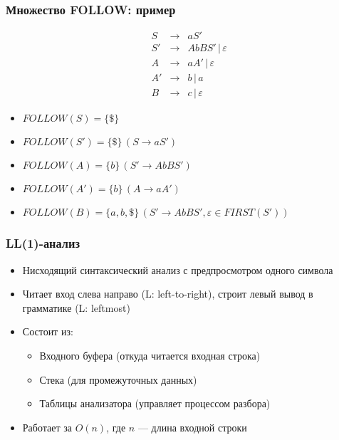 \documentclass{beamer}
\begin{document}
\begin{frame}[fragile]
  \transwipe[direction=90]
  \frametitle{Множество FOLLOW: пример}
  $$
  \begin{array}{crcl}
  &S  & \rightarrow & a S' \\
  
  &S' & \rightarrow & A b B S' \, | \, \varepsilon \\
  
  &A  & \rightarrow & a A' \, | \, \varepsilon \\
  &A' & \rightarrow & b \, | \, a \\
  &B  & \rightarrow & c \, | \, \varepsilon  
  \end{array}
  $$ \pause
  
  \begin{itemize}
    \item $FOLLOW(S) = \{ \$ \}$ \pause
    \item $FOLLOW(S') = \{ \$ \} \, (S \rightarrow a S')$  \pause
    \item $FOLLOW(A) = \{ b \} \, (S' \rightarrow A b B S')$ \pause
    \item $FOLLOW(A') = \{ b \} \, (A \rightarrow a A')$ \pause
    \item $FOLLOW(B) = \{ a, b, \$ \} \, (S' \rightarrow A b B S', \varepsilon \in FIRST(S'))$ 
  \end{itemize}
\end{frame}

\begin{frame}[fragile]
  \transwipe[direction=90]
  \frametitle{LL(1)-анализ}
  \begin{itemize}
   \item Нисходящий синтаксический анализ с предпросмотром одного символа
   \item Читает вход слева направо (L: left-to-right), строит левый вывод в грамматике (L: leftmost)
   \item Состоит из:
   \begin{itemize}
     \item Входного буфера (откуда читается входная строка)
     \item Стека (для промежуточных данных)
     \item Таблицы анализатора (управляет процессом разбора)
   \end{itemize}
   \item Работает за $O(n)$, где $n$ --- длина входной строки
  \end{itemize}
\end{frame}
\end{document}
